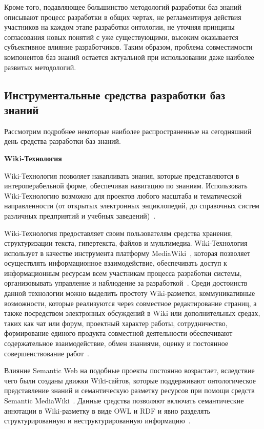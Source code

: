 Кроме того, подавляющее большинство методологий разработки баз знаний описывают процесс разработки в общих чертах, не регламентируя действия участников на каждом этапе разработки онтологии, не уточняя принципы согласования новых понятий с уже существующими, высоким оказывается субъективное влияние разработчиков. Таким образом, проблема совместимости компонентов баз знаний остается актуальной при использовании даже наиболее развитых методологий.

\subsection{Инструментальные средства разработки баз знаний}

Рассмотрим подробнее некоторые наиболее распространенные на сегодняшний день средства разработки баз знаний.

\textbf{Wiki-Технология}

Wiki-Технология позволяет накапливать знания, которые представляются в интероперабельной форме, обеспечивая навигацию по знаниям. Использовать Wiki-Технологию возможно для проектов любого масштаба и тематической направленности (от открытых электронных энциклопедий, до справочных систем различных предприятий и учебных заведений)~\cite{Rogushina2016, Raman2006}. 

Wiki-Технология предоставляет своим пользователям средства хранения, структуризации текста, гипертекста, файлов и мультимедиа. Wiki-Технология использует в качестве инструмента платформу MediaWiki~\cite{MediaWiki2016}, которая позволяет осуществлять информационное взаимодействие, обеспечивать доступ к информационным ресурсам всем участникам процесса разработки системы, организовывать управление и наблюдение за разработкой~\cite{Gladun2008}. Среди достоинств данной технологии можно выделить простоту Wiki-разметки, коммуникативные возможности, которые реализуются через совместное редактирование страниц, а также посредством электронных обсуждений в Wiki или дополнительных средах, таких как чат или форум, проектный характер работы, сотрудничество, формирование единого продукта совместной деятельности обеспечивают содержательное взаимодействие, обмен знаниями, оценку и постоянное совершенствование работ~\cite{Rogushina2016}.

Влияние Semantic Web на подобные проекты постоянно возрастает, вследствие чего были созданы движки Wiki-сайтов, которые поддерживают онтологическое представление знаний и семантическую разметку ресурсов при помощи средств Semantic MediaWiki~\cite{SemMediaWiki2016}. Данные средства позволяют включать семантические аннотации в Wiki-разметку в виде OWL и RDF и явно разделять структурированную и неструктурированную информацию~\cite{Rogushina2016}.

